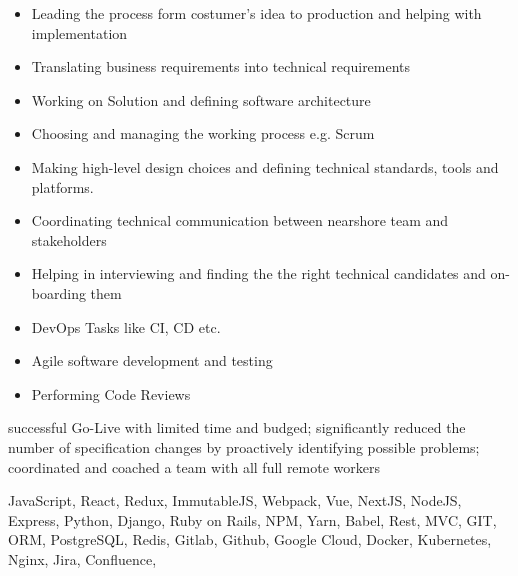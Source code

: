 \documentclass[9pt,a4paper]{altacv}
\begin{document}
%
\makebox[0pt][l]{%
  \hspace{-4cm}
  \raisebox{-\totalheight}[0pt][0pt]{%
   {\color{background}\fontsize{250}{48}\faRocket}
}}%

%


\begin{itemize}
\item Leading the process form costumer's idea to production and helping with implementation
\item Translating business requirements into technical requirements
\item Working on Solution and defining software architecture
\item Choosing and managing the working process e.g. Scrum
\item Making high-level design choices and defining technical standards, tools and platforms.
\item Coordinating technical communication between nearshore team and stakeholders
\item Helping in interviewing and finding the the right technical candidates and on-boarding them
\item DevOps Tasks like CI, CD etc.
\item Agile software development and testing
\item Performing Code Reviews
\end{itemize}

successful Go-Live with limited time and budged;
significantly reduced the number of specification changes by proactively identifying possible problems;
coordinated and coached a team with all full remote workers

JavaScript, React, Redux, ImmutableJS, Webpack, Vue, NextJS, NodeJS, Express,
Python, Django, Ruby on Rails, NPM, Yarn, Babel,
Rest, MVC, GIT, ORM, PostgreSQL, Redis,
Gitlab, Github, Google Cloud, Docker, Kubernetes, Nginx,
Jira, Confluence,

\divider


%
\end{document}
